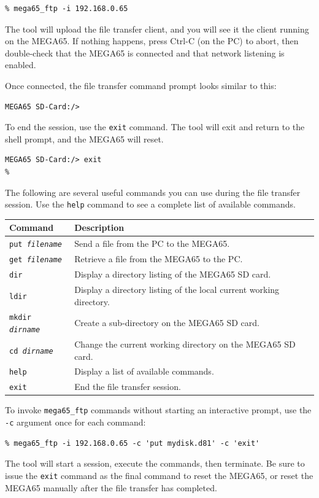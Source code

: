 \begin{verbatim}
% mega65_ftp -i 192.168.0.65
\end{verbatim}

The tool will upload the file transfer client, and you will see it the client running on the MEGA65. If nothing happens, press Ctrl-C (on the PC) to abort, then double-check that the MEGA65 is connected and that network listening is enabled.

Once connected, the file transfer command prompt looks similar to this:

\begin{verbatim}
MEGA65 SD-Card:/>
\end{verbatim}

To end the session, use the {\tt exit} command. The tool will exit and return to the shell prompt, and the MEGA65 will reset.

\begin{verbatim}
MEGA65 SD-Card:/> exit
%
\end{verbatim}

The following are several useful commands you can use during the file transfer session. Use the {\tt help} command to see a complete list of available commands.

\begin{center}
\begin{tabular}{|l|l|}
\hline
{\bf Command} & {\bf Description} \\
\hline
{\tt put {\it filename}} & Send a file from the PC to the MEGA65. \\
\hline
{\tt get {\it filename}} & Retrieve a file from the MEGA65 to the PC. \\
\hline
{\tt dir} & Display a directory listing of the MEGA65 SD card. \\
\hline
{\tt ldir} & Display a directory listing of the local current working directory. \\
\hline
{\tt mkdir {\it dirname}} & Create a sub-directory on the MEGA65 SD card. \\
\hline
{\tt cd {\it dirname}} & Change the current working directory on the MEGA65 SD card. \\
\hline
{\tt help} & Display a list of available commands. \\
\hline
{\tt exit} & End the file transfer session. \\
\hline
\end{tabular}
\end{center}

To invoke {\tt mega65\_ftp} commands without starting an interactive prompt, use the {\tt -c} argument once for each command:

\begin{verbatim}
% mega65_ftp -i 192.168.0.65 -c 'put mydisk.d81' -c 'exit'
\end{verbatim}

The tool will start a session, execute the commands, then terminate. Be sure to issue the {\tt exit} command as the final command to reset the MEGA65, or reset the MEGA65 manually after the file transfer has completed.